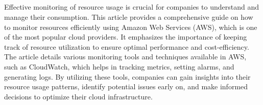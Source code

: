 \documentclass[12pt,letterpaper]{article}
\begin{document}
\subsection*{}
Effective monitoring of resource usage is crucial for companies to understand and manage their consumption. This article provides a comprehensive guide on how to monitor resources efficiently using Amazon Web Services (AWS), which is one of the most popular cloud providers. It emphasizes the importance of keeping track of resource utilization to ensure optimal performance and cost-efficiency. The article details various monitoring tools and techniques available in AWS, such as CloudWatch, which helps in tracking metrics, setting alarms, and generating logs. By utilizing these tools, companies can gain insights into their resource usage patterns, identify potential issues early on, and make informed decisions to optimize their cloud infrastructure.

 
\end{document}
